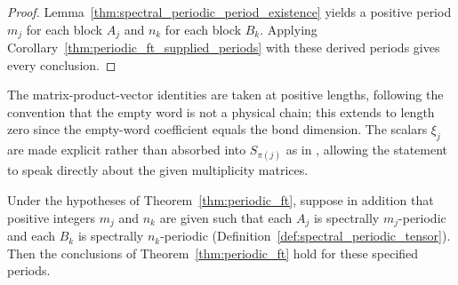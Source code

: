 \begin{proof}
    \leanok
    Lemma~\ref{thm:spectral_periodic_period_existence} yields a positive
    period $m_j$ for each block $A_j$ and $n_k$ for each block $B_k$. Applying
    Corollary~\ref{thm:periodic_ft_supplied_periods} with these derived periods
    gives every conclusion.
\end{proof}

\begin{remark}
    The matrix-product-vector identities are taken at positive lengths, following the convention that the empty word is not a physical chain; this extends to length zero since the empty-word coefficient equals the bond dimension. The scalars $\xi_j$ are made explicit rather than absorbed into $S_{\pi(j)}$ as in \cite[lines~667--671]{DeLasCuevas2017Irreducible}, allowing the statement to speak directly about the given multiplicity matrices.
\end{remark}

\begin{corollary}%
    \label{thm:periodic_ft_supplied_periods}
    \leanok
    Under the hypotheses of Theorem~\ref{thm:periodic_ft}, suppose in addition
    that positive integers $m_j$ and $n_k$ are given such that each $A_j$ is
    spectrally $m_j$-periodic and each $B_k$ is spectrally $n_k$-periodic
    (Definition~\ref{def:spectral_periodic_tensor}). Then the conclusions of
    Theorem~\ref{thm:periodic_ft} hold for these specified periods.
\end{corollary}

